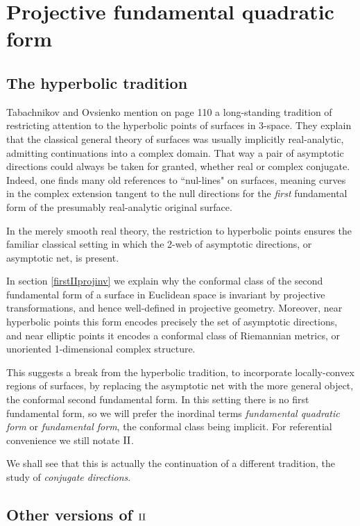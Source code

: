 \documentclass[11pt]{article}
\numberwithin{equation}{section}
\theoremstyle{plain}
\theoremstyle{remark}
\newcommand{\II}{\textnormal{II}}
\begin{document}
\section{Projective fundamental quadratic form}\label{projfond}

\subsection{The hyperbolic tradition}

Tabachnikov and Ovsienko \cite{to} mention on page 110 a long-standing tradition of restricting attention to the hyperbolic points of surfaces in 3-space. They explain that the classical general theory of surfaces was usually implicitly real-analytic, admitting continuations into a complex domain. That way a pair of asymptotic directions could always be taken for granted, whether real or complex conjugate. Indeed, one finds many old references to ``nul-lines" on surfaces, meaning curves in the complex extension tangent to the null directions for the \emph{first} fundamental form of the presumably real-analytic original surface.

In the merely smooth real theory, the restriction to hyperbolic points ensures the familiar classical setting in which the 2-web of asymptotic directions, or asymptotic net, is present.
 
In section \ref{firstIIprojinv} we explain why the conformal class of the second fundamental form of a surface in Euclidean space is invariant by projective transformations, and hence well-defined in projective geometry. Moreover, near hyperbolic points this form encodes precisely the set of asymptotic directions, and near elliptic points it encodes a conformal class of Riemannian metrics, or unoriented 1-dimensional complex structure.

This suggests a break from the hyperbolic tradition, to incorporate locally-convex regions of surfaces, by replacing the asymptotic net with the more general object, the conformal second fundamental form.  In this setting there is no first fundamental form, so we will prefer the inordinal terms \emph{fundamental quadratic form} or \emph{fundamental form}, the conformal class being implicit. For referential convenience we still notate $\II$.

We shall see that this is actually the continuation of a different tradition, the study of \emph{conjugate directions}.

\subsection{Other versions of $\II$}
\end{document}

